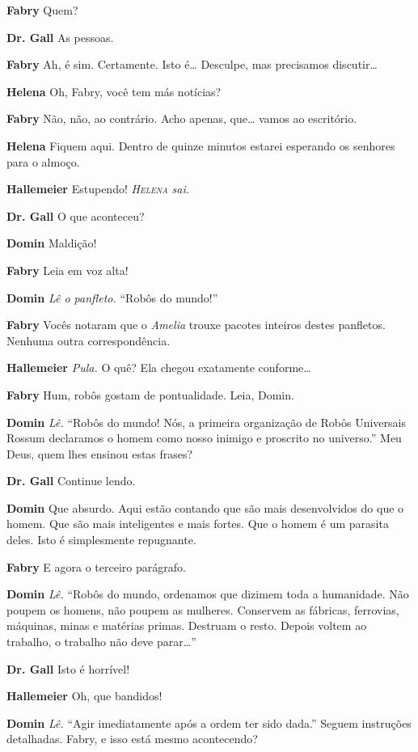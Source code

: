\textbf{Fabry} Quem?

\textbf{Dr. Gall} As pessoas.

\textbf{Fabry} Ah, é sim. Certamente. Isto é\ldots{} Desculpe, mas precisamos discutir\ldots{}

\textbf{Helena} Oh, Fabry, você tem más notícias?

\textbf{Fabry} Não, não, ao contrário. Acho apenas, que\ldots{} vamos ao escritório.

\textbf{Helena} Fiquem aqui. Dentro de quinze minutos estarei esperando os senhores para o
almoço.

\textbf{Hallemeier} Estupendo!
\emph{\textsc{Helena} sai.}

\textbf{Dr. Gall} O que aconteceu?

\textbf{Domin} Maldição!

\textbf{Fabry} Leia em voz alta!

\textbf{Domin} \emph{Lê o panfleto.} ``Robôs do mundo!''

\textbf{Fabry} Vocês notaram que o \textit{Amelia} trouxe pacotes inteiros destes panfletos.
Nenhuma outra correspondência.

\textbf{Hallemeier} \emph{Pula.} O quê? Ela chegou exatamente conforme\ldots{}

\textbf{Fabry} Hum, robôs gostam de pontualidade. Leia, Domin.

\textbf{Domin} \emph{Lê.} ``Robôs do mundo! Nós, a primeira organização de Robôs
Universais Rossum declaramos o homem como nosso inimigo e proscrito no
universo.'' Meu Deus, quem lhes ensinou estas frases?

\textbf{Dr. Gall} Continue lendo.

\textbf{Domin} Que absurdo. Aqui estão contando que são mais desenvolvidos do que o
homem. Que são mais inteligentes e mais fortes. Que o homem é um parasita deles.
Isto é simplesmente repugnante.

\textbf{Fabry} E agora o terceiro parágrafo. 

\textbf{Domin} \emph{Lê.} ``Robôs do mundo, ordenamos que dizimem toda a humanidade. 
Não poupem os homens, não poupem as mulheres. Conservem as fábricas,
ferrovias, máquinas, minas e matérias primas. Destruam o resto. Depois voltem ao
trabalho, o trabalho não deve parar\ldots{}''

\textbf{Dr. Gall} Isto é horrível!

\textbf{Hallemeier} Oh, que bandidos!

\textbf{Domin} \emph{Lê.} ``Agir imediatamente após a ordem ter sido dada.'' Seguem
instruções detalhadas. Fabry, e isso está mesmo acontecendo?


